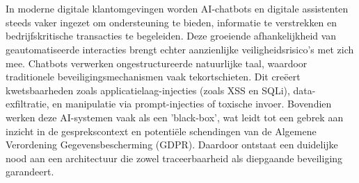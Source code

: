 
%
%
%
%
%

%



\chapter*{}


In moderne digitale klantomgevingen worden AI-chatbots en digitale assistenten steeds vaker ingezet om ondersteuning te bieden, informatie te verstrekken en bedrijfskritische transacties te begeleiden. Deze groeiende afhankelijkheid van geautomatiseerde interacties brengt echter aanzienlijke veiligheidsrisico’s met zich mee. Chatbots verwerken ongestructureerde natuurlijke taal, waardoor traditionele beveiligingsmechanismen vaak tekortschieten. Dit creëert kwetsbaarheden zoals applicatielaag-injecties (zoals XSS en SQLi), data-exfiltratie, en manipulatie via prompt-injecties of toxische invoer. Bovendien werken deze AI-systemen vaak als een 'black-box', wat leidt tot een gebrek aan inzicht in de gesprekscontext en potentiële schendingen van de Algemene Verordening Gegevensbescherming (GDPR). Daardoor ontstaat een duidelijke nood aan een architectuur die zowel traceerbaarheid als diepgaande beveiliging garandeert.
    \\
    
